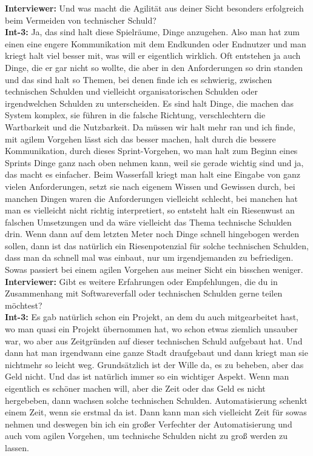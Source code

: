 \textbf{Interviewer:} Und was macht die Agilität aus deiner Sicht besonders erfolgreich beim Vermeiden von technischer Schuld?\\
\textbf{Int-3:} Ja, das sind halt diese Spielräume, Dinge anzugehen. Also man hat zum einen eine engere Kommunikation mit dem Endkunden oder Endnutzer und man kriegt halt viel besser mit, was will er eigentlich wirklich. Oft entstehen ja auch Dinge, die er gar nicht so wollte, die aber in den Anforderungen so drin standen und das sind halt so Themen, bei denen finde ich es schwierig, zwischen technischen Schulden und vielleicht organisatorischen Schulden oder irgendwelchen Schulden zu unterscheiden. Es sind halt Dinge, die machen das System komplex, sie führen in die falsche Richtung, verschlechtern die Wartbarkeit und die Nutzbarkeit. Da müssen wir halt mehr ran und ich finde, mit agilem Vorgehen lässt sich das besser machen, halt durch die bessere Kommunikation, durch dieses Sprint-Vorgehen, wo man halt zum Beginn eines Sprints Dinge ganz nach oben nehmen kann, weil sie gerade wichtig sind und ja, das macht es einfacher. Beim Wasserfall kriegt man halt eine Eingabe von ganz vielen Anforderungen, setzt sie nach eigenem Wissen und Gewissen durch, bei manchen Dingen waren die Anforderungen vielleicht schlecht, bei manchen hat man es vielleicht nicht richtig interpretiert, so entsteht halt ein Riesenwust an falschen Umsetzungen und da wäre vielleicht das Thema technische Schulden drin. Wenn dann auf dem letzten Meter noch Dinge schnell hingebogen werden sollen, dann ist das natürlich ein Riesenpotenzial für solche technischen Schulden, dass man da schnell mal was einbaut, nur um irgendjemanden zu befriedigen. Sowas passiert bei einem agilen Vorgehen aus meiner Sicht ein bisschen weniger.\\
\textbf{Interviewer:} Gibt es weitere Erfahrungen oder Empfehlungen, die du in Zusammenhang mit Softwareverfall oder technischen Schulden gerne teilen möchtest?\\
\textbf{Int-3:} Es gab natürlich schon ein Projekt, an dem du auch mitgearbeitet hast, wo man quasi ein Projekt übernommen hat, wo schon etwas ziemlich unsauber war, wo aber aus Zeitgründen auf dieser technischen Schuld aufgebaut hat. Und dann hat man irgendwann eine ganze Stadt draufgebaut und dann kriegt man sie nichtmehr so leicht weg. Grundsätzlich ist der Wille da, es zu beheben, aber das Geld nicht. Und das ist natürlich immer so ein wichtiger Aspekt. Wenn man eigentlich es schöner machen will, aber die Zeit oder das Geld es nicht hergebeben, dann wachsen solche technischen Schulden. Automatisierung schenkt einem Zeit, wenn sie erstmal da ist. Dann kann man sich vielleicht Zeit für sowas nehmen und deswegen bin ich ein großer Verfechter der Automatisierung und auch vom agilen Vorgehen, um technische Schulden nicht zu groß werden zu lassen. \\


